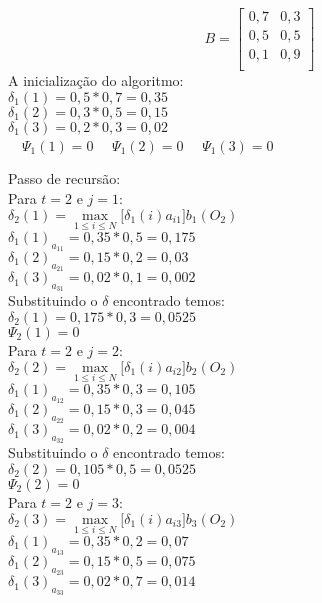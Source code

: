 $$B=\left[ \begin{array}{ll}
 0,7 & 0,3 \\
 0,5 & 0,5\\
0,1 & 0,9\\
 \end{array} \right]$$
A inicialização do algoritmo:\\
$\delta_1 (1) = 0,5 * 0,7 = 0,35$ \\
$\delta_1 (2) = 0,3 * 0,5 = 0,15$ \\
$\delta_1 (3) = 0,2 * 0,3 = 0,02$ \\
$\quad \Psi_1 (1) = 0$
$\quad \Psi_1 (2) = 0$
$\quad \Psi_1 (3) = 0$\\

\begin{multicols}{2}
Passo de recursão:\\

Para $t=2$ e $j = 1$:\\
$\displaystyle \delta_2 (1) = \max\limits_{1 \leq i \leq N} \Big[\delta_{1}(i) a_{i1} \Big]b_1 (O_2)$\\
$\delta_1(1)_{a_{11}} = 0,35 * 0,5 = 0,175$\\
$\delta_1(2)_{a_{21}} = 0,15 * 0,2 = 0,03$ \\
$\delta_1(3)_{a_{31}} = 0,02 * 0,1 = 0,002$\\


Substituindo o $\delta$ encontrado temos:\\
$\delta_2(1) = 0,175 * 0,3 = 0,0525$\\
$\Psi_2(1) = 0$\\

Para $t=2$ e $j = 2$:\\
$\displaystyle \delta_2 (2) = \max\limits_{1 \leq i \leq N} \Big[\delta_{1}(i) a_{i2} \Big]b_2 (O_2)$\\
$\delta_1(1)_{a_{12}} = 0,35 * 0,3 = 0,105$\\
$\delta_1(2)_{a_{22}} = 0,15 * 0,3 = 0,045$\\ 
$\delta_1(3)_{a_{32}} = 0,02 * 0,2 = 0,004$\\

 
 Substituindo o $\delta$ encontrado temos:\\
$\delta_2(2) = 0,105 * 0,5 = 0,0525$\\ 
$\Psi_2(2) = 0$\\

Para $t=2$ e $j = 3$:\\
$\displaystyle \delta_2 (3) = \max\limits_{1 \leq i \leq N} \Big[\delta_{1}(i) a_{i3} \Big]b_3 (O_2)$\\
$\delta_1(1)_{a_{13}} = 0,35 * 0,2 = 0,07$\\
$\delta_1(2)_{a_{23}} = 0,15 * 0,5 = 0,075$\\ 
$\delta_1(3)_{a_{33}} = 0,02 * 0,7 = 0,014$\\
 

\end{multicols}
